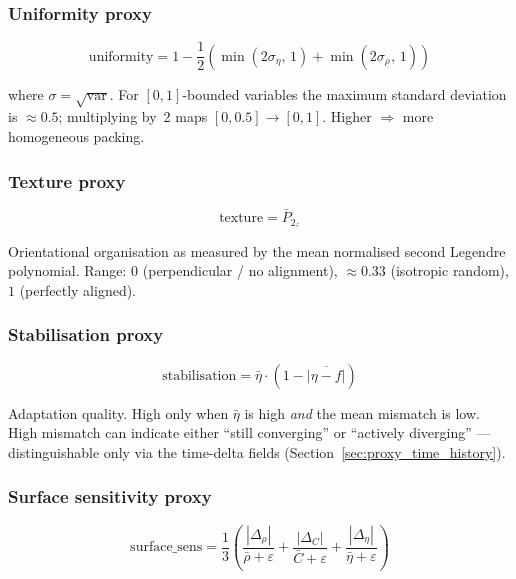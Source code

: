 \documentclass[11pt]{article}
\begin{document}
\subsubsection{Uniformity proxy}
\begin{equation}
  \text{uniformity} = 1 - \frac{1}{2}\left(
    \min(2\sigma_\eta,\, 1) + \min(2\sigma_{\rho_{\hat{}}},\, 1)\right)
  \label{eq:uniformity_proxy}
\end{equation}

where $\sigma = \sqrt{\text{var}}$.  For $[0,1]$-bounded variables the
maximum standard deviation is $\approx 0.5$; multiplying by~2 maps
$[0, 0.5] \to [0, 1]$.  Higher $\Rightarrow$ more homogeneous packing.

\subsubsection{Texture proxy}
\begin{equation}
  \text{texture} = \bar{P}_{2,\hat{}}
  \label{eq:texture_proxy}
\end{equation}

Orientational organisation as measured by the mean normalised second
Legendre polynomial.  Range: $0$ (perpendicular / no alignment),
$\approx 0.33$ (isotropic random), $1$ (perfectly aligned).

\subsubsection{Stabilisation proxy}
\begin{equation}
  \text{stabilisation} = \bar\eta \cdot (1 - \overline{|\eta - f|})
  \label{eq:stabilization_proxy}
\end{equation}

Adaptation quality.  High only when $\bar\eta$ is high \textit{and}
the mean mismatch is low.  High mismatch can indicate either ``still
converging'' or ``actively diverging'' --- distinguishable only via the
time-delta fields (Section~\ref{sec:proxy_time_history}).

\subsubsection{Surface sensitivity proxy}
\begin{equation}
  \text{surface\_sens} = \frac{1}{3}\left(
    \frac{|\Delta_\rho|}{\bar\rho + \varepsilon} +
    \frac{|\Delta_C|}{\bar{C} + \varepsilon} +
    \frac{|\Delta_\eta|}{\bar\eta + \varepsilon} \right)
  \label{eq:surface_sensitivity_proxy}
\end{equation}
\end{document}
